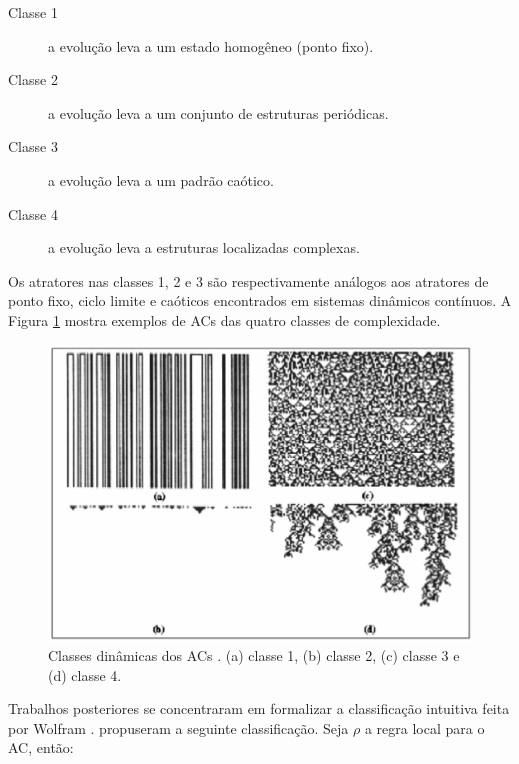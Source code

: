 \documentclass[12pt,a4paper]{article}
\begin{document}
\begin{description}
\item[Classe 1] a evolução leva a um estado homogêneo (ponto fixo).
\item[Classe 2] a evolução leva a um conjunto de estruturas periódicas.
\item[Classe 3] a evolução leva a um padrão caótico.
\item[Classe 4] a evolução leva a estruturas localizadas complexas.
\end{description}

Os atratores nas classes 1, 2 e 3 são respectivamente análogos aos atratores
de ponto fixo, ciclo limite e caóticos encontrados em sistemas dinâmicos
contínuos. A Figura \ref{fig:classes} mostra exemplos de ACs
das quatro classes de complexidade.

\begin{figure}[htp]
\begin{center}
\includegraphics[scale=0.5]{img/classes.eps}
\caption{Classes dinâmicas dos ACs .
(a) classe 1, (b) classe 2, (c) classe 3 e (d) classe 4.}
\label{fig:classes}
\end{center}
\end{figure}

Trabalhos posteriores se concentraram em formalizar a classificação intuitiva
feita por Wolfram .  propuseram a seguinte
classificação.  Seja $\rho$ a regra local para o AC, então:
\end{document}
